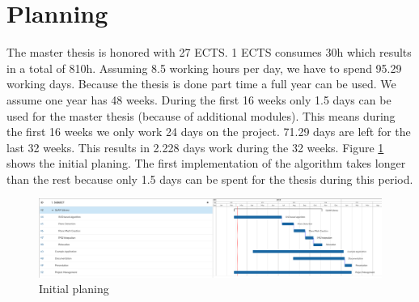\documentclass[11pt,a4paper,titlepage,oneside]{report}
\begin{document}
\section{Planning}
The master thesis is honored with 27 ECTS. 1 ECTS consumes 30h which results in a total of 810h. Assuming 8.5 working hours per day, we have to spend 95.29 working days. Because the thesis is done part time a full year can be used. We assume one year has 48 weeks. During the first 16 weeks only 1.5 days can be used for the master thesis (because of additional modules). This means during the first 16 weeks we only work 24 days on the project. 71.29 days are left for the last 32 weeks. This results in 2.228 days work during the 32 weeks. Figure \ref{fig:gantt} shows the initial planing. The first implementation of the algorithm takes longer than the rest because only 1.5 days can be spent for the thesis during this period.

\begin{figure}[H]
	\includegraphics[width=1.0\textwidth]{img/gantt.png}
	\caption{Initial planing}\label{fig:gantt}
\end{figure}
\end{document}
